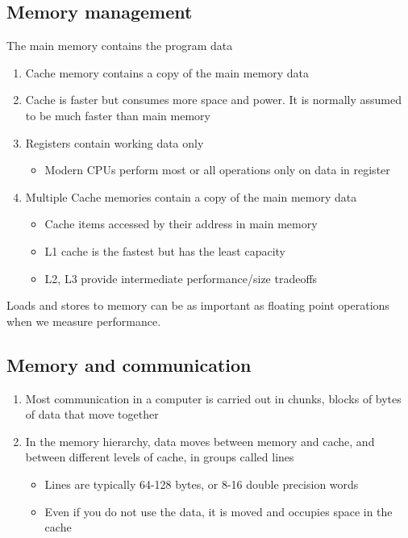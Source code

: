 \documentclass[%
oneside,                 %
final,                   %
10pt]{article}
\begin{document}
\subsection*{Memory management}
The main memory contains the program data
\begin{enumerate}
\item Cache memory contains a copy of the main memory data

\item Cache is faster but consumes more space and power. It is normally assumed to be much faster than main memory

\item Registers contain working data only
\begin{itemize}

 \item Modern CPUs perform most or all operations only on data in register

\end{itemize}

\noindent
\item Multiple Cache memories contain a copy of the main memory data
\begin{itemize}

 \item Cache items accessed by their address in main memory

 \item L1 cache is the fastest but has the least capacity

 \item L2, L3 provide intermediate performance/size tradeoffs
\end{itemize}

\noindent
\end{enumerate}

\noindent
Loads and stores to memory can be as important as floating point operations when we measure performance.

\subsection*{Memory and communication}

\begin{enumerate}
\item Most communication in a computer is carried out in chunks, blocks of bytes of data that move together

\item In the memory hierarchy, data moves between memory and cache, and between different levels of cache, in groups called lines
\begin{itemize}

 \item Lines are typically 64-128 bytes, or 8-16 double precision words

 \item Even if you do not use the data, it is moved and occupies space in the cache
\end{itemize}

\noindent
\end{enumerate}
\end{document}
